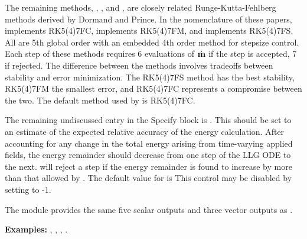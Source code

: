 \begin{description}
The remaining methods, ,  ,
and , are closely related Runge-Kutta-Fehlberg methods
derived by Dormand and Prince\cite{dormand80,dormand86}.  In the
nomenclature of these papers,
 implements RK5(4)7FC,
 implements RK5(4)7FM, and
 implements RK5(4)7FS.
All are 5th global order with an embedded 4th order method for stepsize
control.  Each step of these methods requires 6 evaluations of
$\dot{\textbf{m}}$ if the step is accepted, 7 if rejected.  The difference
between the methods involves tradeoffs between stability and error
minimization.  The RK5(4)7FS method has the best stability, RK5(4)7FM
the smallest error, and RK5(4)7FC represents a compromise between the
two.  The default method used by  is
RK5(4)7FC.

\label{html:oxsrkeprecision}
The remaining undiscussed entry in the 
Specify block is .  This should be set to an
estimate of the expected relative accuracy of the energy calculation.
After accounting for any change in the total energy arising from
time-varying applied fields, the energy remainder should decrease from
one step of the LLG ODE to the next.   will
reject a step if the energy remainder is found to increase by more than
that allowed by .  The default value for
 is   This control
may be disabled by setting  to -1.

The  module provides the same five scalar
outputs and three vector outputs as .

\textbf{Examples:} , ,
                   , .


\end{description}
